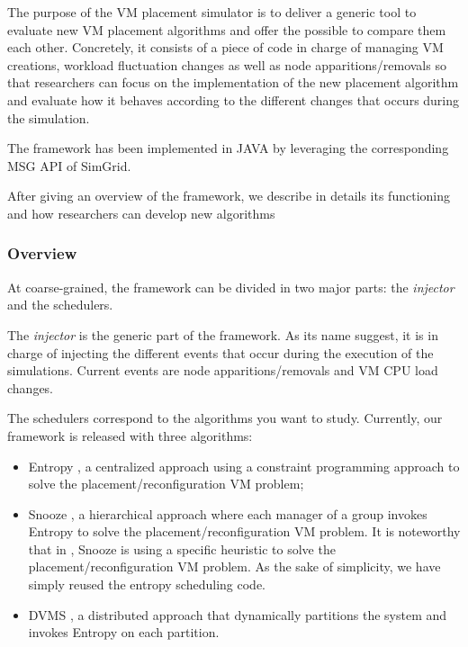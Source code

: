 \documentclass[conference]{IEEEtran}
\newcommand{\sg}{SimGrid\xspace}
\begin{document}
The purpose of the VM placement simulator is to deliver a generic tool
to evaluate new VM placement algorithms and offer the possible to
compare them each other. Concretely, it consists of  a piece of code in charge of managing VM
creations, workload fluctuation changes as well as node apparitions/removals so
that researchers can focus on the implementation of the new placement
algorithm and evaluate how it behaves according to the different
changes that occurs during the simulation.

The framework has been implemented in JAVA by leveraging the
corresponding MSG API of \sg.

After giving an overview of the framework, we describe in details its
functioning and how researchers can develop new algorithms

\subsubsection{Overview}
At coarse-grained,
the framework can be
divided in two major parts: the \emph{injector} and the schedulers.

The \emph{injector} is the generic part of the framework. As its name
suggest, it is in charge of injecting the different events that occur
during the execution of the simulations. Current events are node
apparitions/removals  and VM CPU load changes.

The schedulers correspond to the  algorithms you want to study.
Currently, our framework is released with three algorithms:
\begin{itemize}
\item Entropy \cite{Hermenier:2009:ECM:1508293.1508300}, a centralized approach using a constraint programming approach to solve the placement/reconfiguration VM problem;
 \item Snooze \cite{feller:ccgrid12}, a hierarchical approach where
   each manager of a group invokes Entropy to solve the
   placement/reconfiguration VM problem. It is noteworthy that in
   \cite{feller:ccgrid12}, Snooze is using a specific heuristic to solve the placement/reconfiguration VM problem. As the sake of simplicity, we have simply reused the entropy scheduling code.
\item  DVMS \cite{quesnel:cpe2012}, a distributed approach that dynamically partitions the system and invokes Entropy on each partition.
\end{itemize}
\end{document}
